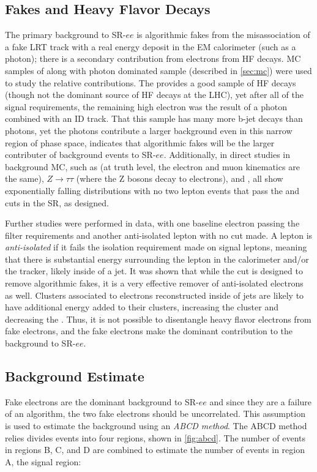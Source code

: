 \subsection{Fakes and Heavy Flavor Decays}

The primary background to SR-$ee$ is algorithmic fakes from the misassociation of a fake \ac{LRT} track with a real energy deposit in the \ac{EM} calorimeter (such as a photon); there is a secondary contribution from electrons from \ac{HF} decays. \ac{MC} samples of \ttbar along with photon dominated sample (described in \autoref{sec:mc}) were used to study the relative contributions. The \ttbar provides a good sample of \ac{HF} decays (though not the dominant source of \ac{HF} decays at the \ac{LHC}), yet after all of the signal requirements, the remaining high \absdz electron was the result of a photon combined with an \ac{ID} track. That this sample has many more b-jet decays than photons, yet the photons contribute a larger background even in this narrow region of phase space, indicates that algorithmic fakes will be the larger contributer of background events to SR-$ee$. Additionally, in direct studies in background \ac{MC}, such as \bbmm (at truth level, the electron and muon kinematics are the same), $Z\rightarrow \tau\tau$ (where the Z bosons decay to electrons), and \ttbar, all show exponentially falling distributions with no two lepton events that pass the \pt and \absdz cuts in the \ac{SR}, as designed. 

Further studies were performed in data, with one baseline electron passing the filter requirements and another anti-isolated lepton with no \absdz cut made. A lepton is \emph{anti-isolated} if it fails the isolation requirement made on signal leptons, meaning that there is substantial energy surrounding the lepton in the calorimeter and/or the tracker, likely inside of a jet. It was shown that while the \dpt cut is designed to remove algorithmic fakes, it is a very effective remover of anti-isolated electrons as well. Clusters associated to electrons reconstructed inside of jets are likely to have additional energy added to their clusters, increasing the cluster \pt and decreasing the \dpt. Thus, it is not possible to disentangle heavy flavor electrons from fake electrons, and the fake electrons make the dominant contribution to the background to SR-$ee$.


\subsection{Background Estimate}
Fake electrons are the dominant background to SR-$ee$ and since they are a failure of an algorithm, the two fake electrons should be uncorrelated. This assumption is used to estimate the background using an \emph{ABCD method}. The ABCD method relies divides events into four regions, shown in \autoref{fig:abcd}. The number of events in regions B, C, and D are combined to estimate the number of events in region A, the signal region:

